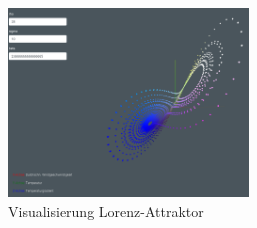 \begin{figure}
	\centering	\includegraphics[height=5cm]{lorenz/assets/implementation/Visualisierung}
	\caption{Visualisierung Lorenz-Attraktor}
	\label{fig:visualisierung}
\end{figure}
